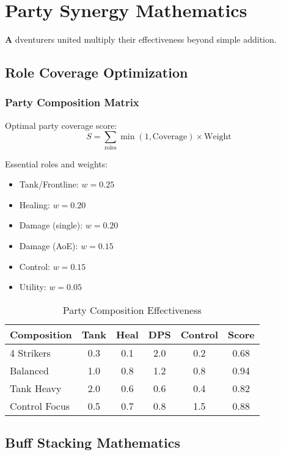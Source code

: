 \documentclass[11pt,letterpaper,openany]{book}
\newcommand{\firstletter}[1]{%
    \textcolor{bloodred}{\fontsize{48}{48}\selectfont\bfseries #1}%
}
\begin{document}
\chapter{Party Synergy Mathematics}

\firstletter{A}dventurers united multiply their effectiveness beyond simple addition.

\section{Role Coverage Optimization}

\subsection{Party Composition Matrix}

Optimal party coverage score:
\begin{equation}
S = \sum_{\text{roles}} \min(1, \text{Coverage}) \times \text{Weight}
\end{equation}

Essential roles and weights:
\begin{itemize}
    \item Tank/Frontline: $w = 0.25$
    \item Healing: $w = 0.20$
    \item Damage (single): $w = 0.20$
    \item Damage (AoE): $w = 0.15$
    \item Control: $w = 0.15$
    \item Utility: $w = 0.05$
\end{itemize}

\begin{table}[h]
\centering
\begin{tabular}{@{}lccccc@{}}
\toprule
\textbf{Composition} & \textbf{Tank} & \textbf{Heal} & \textbf{DPS} & \textbf{Control} & \textbf{Score} \\
\midrule
4 Strikers & 0.3 & 0.1 & 2.0 & 0.2 & 0.68 \\
Balanced & 1.0 & 0.8 & 1.2 & 0.8 & 0.94 \\
Tank Heavy & 2.0 & 0.6 & 0.6 & 0.4 & 0.82 \\
Control Focus & 0.5 & 0.7 & 0.8 & 1.5 & 0.88 \\
\bottomrule
\end{tabular}
\caption{Party Composition Effectiveness}
\end{table}

\section{Buff Stacking Mathematics}
\end{document}
